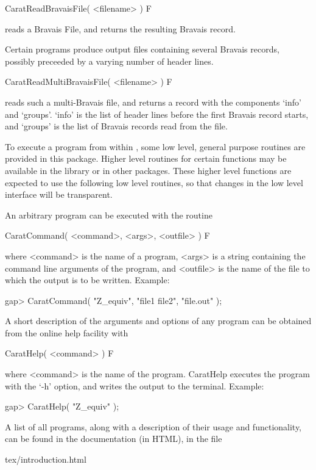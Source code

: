 \>CaratReadBravaisFile( <filename> ) F

reads a Bravais File, and returns the resulting Bravais record.

Certain {\CARAT} programs produce output files containing several Bravais 
records, possibly preceeded by a varying number of header lines.

\>CaratReadMultiBravaisFile( <filename> ) F

reads such a multi-Bravais file, and returns a record with the components
`info' and `groups'. `info' is the list of header lines before the first
Bravais record starts, and `groups' is the list of Bravais records read from
the file.


To execute a {\CARAT} program from within {\GAP}, some low level,
general purpose routines are provided in this package. 
Higher level routines for certain {\CARAT} functions may be available 
in the {\GAP} library or in other packages. These higher
level functions are expected to use the following low level routines,
so that changes in the low level interface will be transparent. 

An arbitrary {\CARAT} program can be executed with the routine

\>CaratCommand( <command>, <args>, <outfile> ) F

where <command> is the name of a {\CARAT} program, <args> is a string
containing the command line arguments of the {\CARAT} program,
and <outfile> is the name of the file to which the output is to be 
written. Example:

\begintt
gap> CaratCommand( "Z_equiv", "file1 file2", "file.out" );
\endtt

A short description of the arguments and options of any {\CARAT} 
program can be obtained from the {\CARAT} online help facility with

\>CaratHelp( <command> ) F

where <command> is the name of the {\CARAT} program. CaratHelp executes
the program with the `-h' option, and writes the output to the 
terminal. Example:

\begintt
gap> CaratHelp( "Z_equiv" );
\endtt

A list of all {\CARAT} programs, along with a description of their
usage and functionality, can be found in the {\CARAT} documentation 
(in HTML), in the file

\begintt
tex/introduction.html
\endtt

